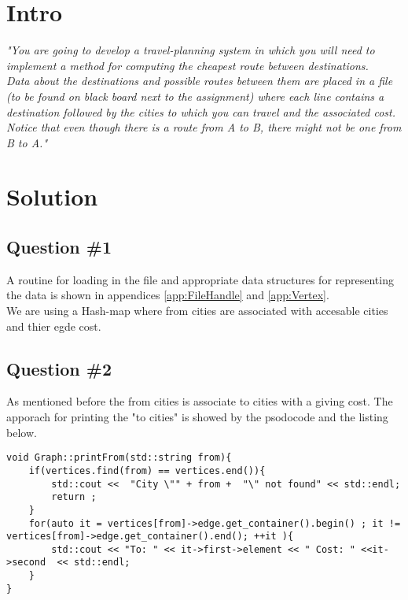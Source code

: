 \section{Intro}
\label{sec:intro}
\textit{"You are going to develop a travel-planning system in which you will need to implement a method for computing the cheapest route between destinations. \\
Data about the destinations and possible routes between them are placed in a file (to be found on black board next to the assignment) where each line contains a destination followed by the cities to which you can travel and the associated cost. \\
Notice that even though there is a route from A to B, there might not be one from B to A."}


\section{Solution}
\subsection{Question \#1}
A routine for loading in the file and appropriate data structures for representing the data is shown in appendices \ref{app:FileHandle} and \ref{app:Vertex}.\\
We are using a Hash-map where from cities are associated with accesable cities and thier egde cost.

\subsection{Question \#2}
As mentioned before the from cities is associate to cities with a giving cost.  The apporach for printing the "to cities" is showed by the psodocode and the listing below. 

\begin{lstlisting}
void Graph::printFrom(std::string from){
	if(vertices.find(from) == vertices.end()){
		std::cout <<  "City \"" + from +  "\" not found" << std::endl;
		return ;
	}
	for(auto it = vertices[from]->edge.get_container().begin() ; it != vertices[from]->edge.get_container().end(); ++it ){
		std::cout << "To: " << it->first->element << " Cost: " <<it->second  << std::endl;
	}
} 
\end{lstlisting}
\bigskip

